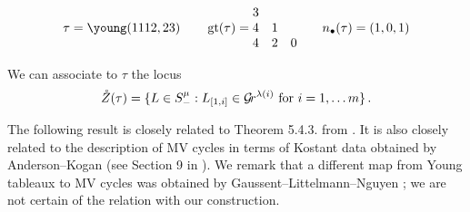 \documentclass[draft]{article} %
\begin{document}

    \[
        \tau = \young(1112,23) \qquad \gt(\tau) = \begin{matrix}
            3 \\
            4 & 1 \\ 
            4 & 2 & 0 
        \end{matrix} \qquad n_\bullet(\tau) = (1,0,1) %
    \]
% 
% 


We can associate to $\tau$ the locus 
%  
\begin{equation*}
    \mathring Z(\tau) = 
        \{
            L\in S^\mu_- : L_{[1,i]} \in\mathcal{G}\!r^{\lambda(i)}\text{ for } i = 1, \dots m 
        \}\,. 
\end{equation*}
% 

The following result is closely related to  Theorem 5.4.3. from \cite{dthesis}. It is also closely related to the description of MV cycles in terms of Kostant data obtained by Anderson--Kogan \cite{anderson2004mirkovic} (see Section 9 in \cite{kamnitzer2010mirkovic}).  
We remark that a different map from Young tableaux to MV cycles was obtained by Gaussent--Littelmann--Nguyen \cite[Theorem 2]{gaussent2013knuth}; we are not certain of the relation with our construction. 
\end{document}
